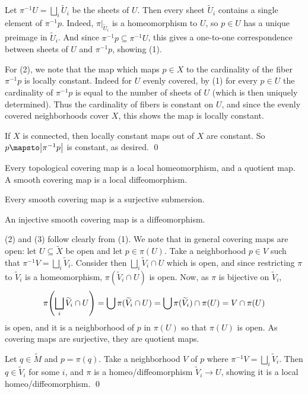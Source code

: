     Let $\pi^{-1}U=\bigsqcup_i\tilde U_i$ be the sheets of $U$.
    Then every sheet $\tilde U_i$ contains a single element of $\pi^{-1}p$.
    Indeed, $\pi|_{\tilde U_i}$ is a homeomorphism to $U$, so $p\in U$ has a unique preimage in $\tilde U_i$.
    And since $\pi^{-1}p\subseteq\pi^{-1}U$, this gives a one-to-one correspondence between sheets of $U$ and $\pi^{-1}p$, showing (1).

    For (2), we note that the map which maps $p\in X$ to the cardinality of the fiber $\pi^{-1}p$ is locally constant.
    Indeed for $U$ evenly covered, by (1) for every $p\in U$ the cardinality of $\pi^{-1}p$ is equal to the number of sheets of $U$ (which is then uniquely determined).
    Thus the cardinality of fibers is constant on $U$, and since the evenly covered neighborhoods cover $X$, this shows the map is locally constant.

    If $X$ is connected, then locally constant maps out of $X$ are constant.
    So $p\mapsto\abs{\pi^{-1}p}$ is constant, as desired.
    \qed

\eproof

\bprop

    \benum
        \item Every topological covering map is a local homeomorphism, and a quotient map.
        A smooth covering map is a local diffeomorphism.
        \item Every smooth covering map is a surjective submersion.
        \item An injective smooth covering map is a diffeomorphism.
    \eenum

\eprop

\bproof

    (2) and (3) follow clearly from (1).
    We note that in general covering maps are open: let $U\subseteq\tilde X$ be open and let $p\in\pi(U)$.
    Take a neighborhood $p\in V$ such that $\pi^{-1}V=\bigsqcup_i\tilde V_i$.
    Consider then $\bigsqcup_i\tilde V_i\cap U$ which is open, and since restricting $\pi$ to $\tilde V_i$ is a
    homeomorphism, $\pi(\tilde V_i\cap U)$ is open.
    Now, as $\pi$ is bijective on $\tilde V_i$,
    $$ \pi\mathopen{}\mathclose{\left(\bigsqcup_i\widetilde V_i\cap U\right)} = \bigcup\pi(\widetilde V_i\cap U) = \bigcup\pi(\widetilde V_i)\cap\pi(U)
    = V\cap\pi(U) $$
    is open, and it is a neighborhood of $p$ in $\pi(U)$ so that $\pi(U)$ is open.
    As covering maps are surjective, they are quotient maps.

    Let $q\in\tilde M$ and $p=\pi(q)$.
    Take a neighborhood $V$ of $p$ where $\pi^{-1}V=\bigsqcup_i\tilde V_i$.
    Then $q\in\tilde V_i$ for some $i$, and $\pi$ is a homeo/diffeomorphism $\tilde V_i\to U$, showing it is a local homeo/diffeomorphism.
    \qed

